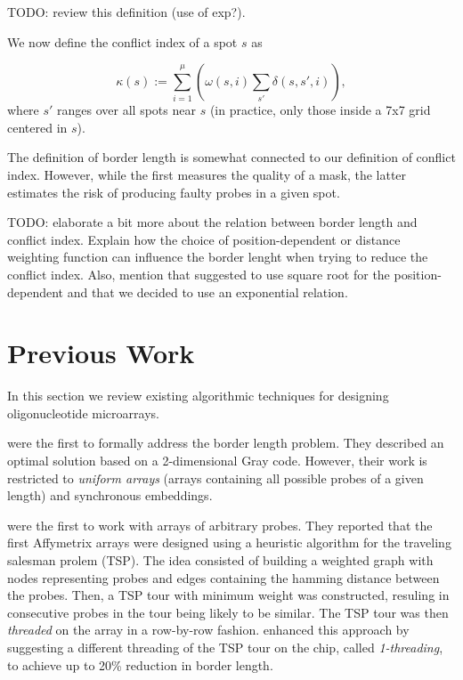 \documentclass{bioinfo}
\begin{document}
TODO: review this definition (use of exp?).

We now define the conflict index of a spot $s$ as

\begin{equation}
\label{eq:conf_idx} \kappa(s) := \sum_{i=1}^{\mu} \left( \omega(s,i) \sum_{s'} \delta(s,s',i) \right),
\end{equation}
where $s'$ ranges over all spots near $s$ (in practice, only those inside a 7x7 grid centered in $s$).

The definition of border length is somewhat connected to our definition of conflict index. However, while the first measures the quality of a mask, the latter estimates the risk of producing faulty probes in a given spot.

TODO: elaborate a bit more about the relation between border length and conflict index. Explain how the choice of position-dependent or distance weighting function can influence the border lenght when trying to reduce the conflict index. Also, mention that \citealp{KAHNG03_1} suggested to use square root for the position-dependent and that we decided to use an exponential relation.

\section{Previous Work}

In this section we review existing algorithmic techniques for designing oligonucleotide microarrays.

\citealp{FELDMAN93} were the first to formally address the border length problem. They described an optimal solution based on a 2-dimensional Gray code. However, their work is restricted to \emph{uniform arrays} (arrays containing all possible probes of a given length) and synchronous embeddings.

\citealp{HANNENHALLI02} were the first to work with arrays of arbitrary probes. They reported that the first Affymetrix arrays were designed using a heuristic algorithm for the traveling salesman prolem (TSP). The idea consisted of building a weighted graph with nodes representing probes and edges containing the hamming distance between the probes. Then, a TSP tour with minimum weight was constructed, resuling in consecutive probes in the tour being likely to be similar. The TSP tour was then \emph{threaded} on the array in a row-by-row fashion. \citealp{HANNENHALLI02} enhanced this approach by suggesting a different threading of the TSP tour on the chip, called \emph{1-threading}, to achieve up to 20\% reduction in border length.
\end{document}
